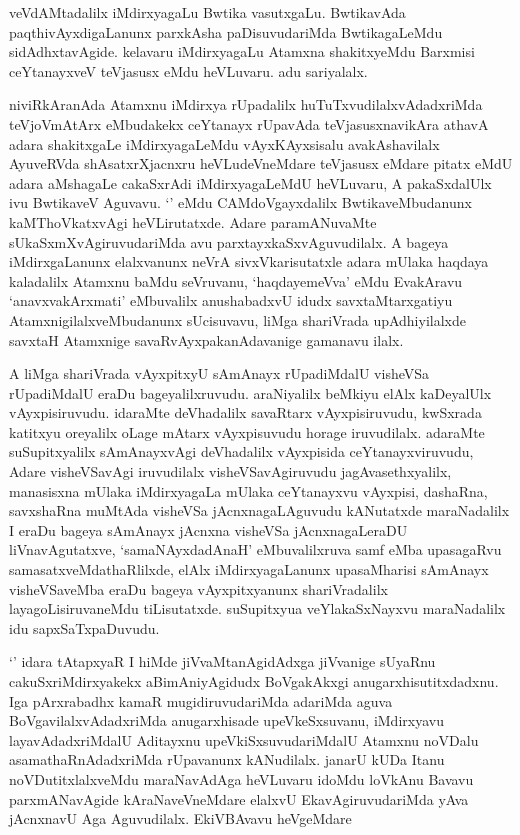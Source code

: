 \begin{artha}
veVdAMtadalilx iMdirxyagaLu Bwtika vasutxgaLu. BwtikavAda paqthivAyxdigaLanunx parxkAsha paDisuvudariMda BwtikagaLeMdu sidAdhxtavAgide. kelavaru iMdirxyagaLu Atamxna shakitxyeMdu Barxmisi ceYtanayxveV teVjasusx eMdu heVLuvaru. adu sariyalalx. 
\end{artha}

\begin{artha}
niviRkAranAda Atamxnu iMdirxya rUpadalilx huTuTxvudilalxvAdadxriMda teVjoVmAtArx eMbudakekx ceYtanayx rUpavAda teVjasusxnavikAra athavA adara shakitxgaLe iMdirxyagaLeMdu vAyxKAyxsisalu avakAshavilalx AyuveRVda shAsatxrXjacnxru heVLudeVneMdare teVjasusx eMdare pitatx eMdU adara aMshagaLe cakaSxrAdi iMdirxyagaLeMdU heVLuvaru, A pakaSxdalUlx ivu BwtikaveV Aguvavu. `\stext ' eMdu CAMdoVgayxdalilx BwtikaveMbudanunx kaMThoVkatxvAgi heVLirutatxde. Adare paramANuvaMte sUkaSxmXvAgiruvudariMda avu parxtayxkaSxvAguvudilalx. A bageya iMdirxgaLanunx elalxvanunx neVrA sivxVkarisutatxle adara mUlaka haqdaya kaladalilx Atamxnu baMdu seVruvanu, `haqdayemeVva' eMdu EvakAravu `anavxvakArxmati' eMbuvalilx anushabadxvU idudx savxtaMtarxgatiyu AtamxnigilalxveMbudanunx sUcisuvavu, liMga shariVrada upAdhiyilalxde savxtaH Atamxnige savaRvAyxpakanAdavanige gamanavu ilalx. 
\end{artha}

\begin{artha}
A liMga shariVrada vAyxpitxyU sAmAnayx rUpadiMdalU visheVSa rUpadiMdalU eraDu bageyalilxruvudu. araNiyalilx beMkiyu elAlx kaDeyalUlx vAyxpisiruvudu. idaraMte deVhadalilx savaRtarx vAyxpisiruvudu, kwSxrada katitxyu oreyalilx oLage mAtarx vAyxpisuvudu horage iruvudilalx. adaraMte suSupitxyalilx sAmAnayxvAgi deVhadalilx vAyxpisida ceYtanayxviruvudu, Adare visheVSavAgi iruvudilalx visheVSavAgiruvudu jagAvasethxyalilx, manasisxna mUlaka iMdirxyagaLa mUlaka ceYtanayxvu vAyxpisi, dashaRna, savxshaRna muMtAda visheVSa jAcnxnagaLAguvudu kANutatxde maraNadalilx I eraDu bageya sAmAnayx jAcnxna visheVSa jAcnxnagaLeraDU liVnavAgutatxve, `samaNAyxdadAnaH' eMbuvalilxruva samf eMba upasagaRvu samasatxveMdathaRlilxde, elAlx iMdirxyagaLanunx upasaMharisi sAmAnayx visheVSaveMba eraDu bageya vAyxpitxyanunx shariVradalilx layagoLisiruvaneMdu tiLisutatxde. suSupitxyua veYlakaSxNayxvu maraNadalilx idu sapxSaTxpaDuvudu. 
\end{artha}

\begin{artha}%
`\stext ' idara tAtapxyaR I hiMde jiVvaMtanAgidAdxga jiVvanige sUyaRnu cakuSxriMdirxyakekx aBimAniyAgidudx BoVgakAkxgi anugarxhisutitxdadxnu. Iga pArxrabadhx kamaR mugidiruvudariMda adariMda aguva BoVgavilalxvAdadxriMda anugarxhisade upeVkeSxsuvanu, iMdirxyavu layavAdadxriMdalU Aditayxnu upeVkiSxsuvudariMdalU Atamxnu noVDalu asamathaRnAdadxriMda rUpavanunx kANudilalx. janarU kUDa Itanu noVDutitxlalxveMdu maraNavAdAga heVLuvaru idoMdu loVkAnu Bavavu parxmANavAgide kAraNaveVneMdare elalxvU EkavAgiruvudariMda yAva jAcnxnavU Aga Aguvudilalx. EkiVBAvavu heVgeMdare 
\end{artha}

